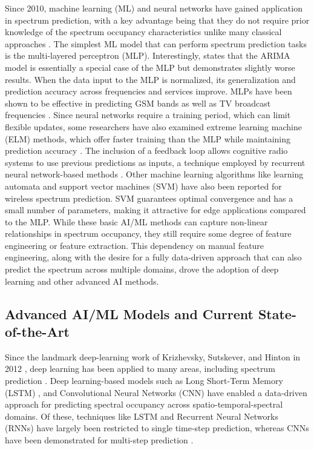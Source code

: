 \documentclass[lettersize,journal]{IEEEtran}
\begin{document}
Since 2010, machine learning (ML) and neural networks have gained application in spectrum prediction, with a key advantage being that they do not require prior knowledge of the spectrum occupancy characteristics unlike many classical approaches \cite{Tumuluru_2010}. The simplest ML model that can perform spectrum prediction tasks is the multi-layered perceptron (MLP). Interestingly, \cite{Yin_2011} states that the ARIMA model is essentially a special case of the MLP but demonstrates slightly worse results. When the data input to the MLP is normalized, its generalization and prediction accuracy across frequencies and services improve. MLPs have been shown to be effective in predicting GSM bands \cite{Yin_2011} as well as TV broadcast frequencies \cite{Winston_2013}. Since neural networks require a training period, which can limit flexible updates, some researchers have also examined extreme learning machine (ELM) methods, which offer faster training than the MLP while maintaining prediction accuracy \cite{Yang_2014}. The inclusion of a feedback loop allows cognitive radio systems to use previous predictions as inputs, a technique employed by recurrent neural network-based methods \cite{Taj_2011, Yang_2013}. Other machine learning algorithms like learning automata \cite{Golestanian_2014} and support vector machines (SVM) \cite{Ni_2011} have also been reported for wireless spectrum prediction. SVM guarantees optimal convergence and has a small number of parameters, making it attractive for edge applications compared to the MLP. While these basic AI/ML methods can capture non-linear relationships in spectrum occupancy, they still require some degree of feature engineering or feature extraction. This dependency on manual feature engineering, along with the desire for a fully data-driven approach that can also predict the spectrum across multiple domains, drove the adoption of deep learning and other advanced AI methods.

\subsection{Advanced AI/ML Models and Current State-of-the-Art}

Since the landmark deep-learning work of Krizhevsky, Sutskever, and Hinton in 2012 \cite{Krizhevsky_2012}, deep learning has been applied to many areas, including spectrum prediction \cite{Wang_2024}. Deep learning-based models such as Long Short-Term Memory (LSTM) \cite{Wang_2017, Ozyegen_2020}, and Convolutional Neural Networks (CNN) \cite{Jia_2020} have enabled a data-driven approach for predicting spectral occupancy across spatio-temporal-spectral domains. Of these, techniques like LSTM and Recurrent Neural Networks (RNNs) have largely been restricted to single time-step prediction, whereas CNNs have been demonstrated for multi-step prediction \cite{Yu_2018}. 
\end{document}
